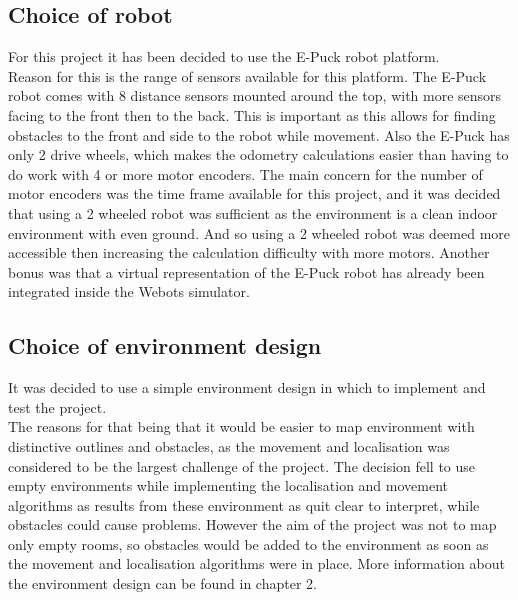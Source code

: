 \subsection{Choice of robot}
For this project it has been decided to use the E-Puck robot platform. \\
Reason for this is the range of sensors available for this platform. The E-Puck robot comes with 8 distance sensors mounted around the top, with more sensors facing to the front then to the back. This is important as this allows for finding obstacles to the front and side to the robot while movement.
Also the E-Puck has only 2 drive wheels, which makes the odometry calculations easier than having to do work with 4 or more motor encoders. The main concern for the number of motor encoders was the time frame available for this project, and it was decided that using a 2 wheeled robot was sufficient as the environment is a clean indoor environment with even ground. And so using a 2 wheeled robot was deemed more accessible then increasing the calculation difficulty with more motors. Another bonus was that a virtual representation of the E-Puck robot has already been integrated inside the Webots\textsuperscript{\texttrademark} simulator.\\

\subsection{Choice of environment design}
It was decided to use a simple environment design in which to implement and test the project.\\
The reasons for that being that it would be easier to map environment with distinctive outlines and obstacles, as the movement and localisation was considered to be the largest challenge of the project.
The decision fell to use empty environments while implementing the localisation and movement algorithms as results from these environment as quit clear to interpret, while obstacles could cause problems. However the aim of the project was not to map only empty rooms, so obstacles would be added to the environment as soon as the movement and localisation algorithms were in place. 
More information about the environment design can be found in chapter 2. 

